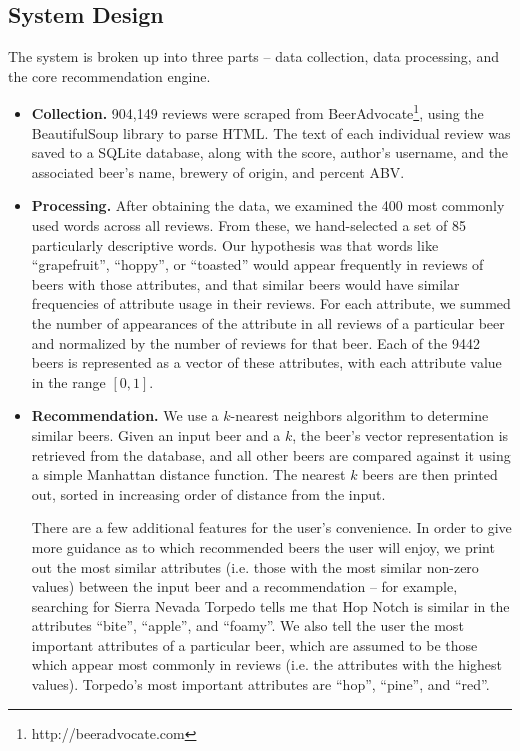 \documentclass[11pt]{article}
\begin{document}
\subsection*{System Design}
The system is broken up into three parts -- data collection, data processing, and the core recommendation engine.
\begin{itemize}
\item \textbf{Collection.} 904,149 reviews were scraped from BeerAdvocate\footnote{http://beeradvocate.com}, using the BeautifulSoup library to parse HTML. The text of each individual review was saved to a SQLite database, along with the score, author's username, and the associated beer's name, brewery of origin, and percent ABV.
\item \textbf{Processing.} After obtaining the data, we examined the 400 most commonly used words across all reviews. From these, we hand-selected a set of 85 particularly descriptive words. Our hypothesis was that words like ``grapefruit'', ``hoppy'', or ``toasted'' would appear frequently in reviews of beers with those attributes, and that similar beers would have similar frequencies of attribute usage in their reviews. For each attribute, we summed the number of appearances of the attribute in all reviews of a particular beer and normalized by the number of reviews for that beer. Each of the 9442 beers is represented as a vector of these attributes, with each attribute value in the range $[0, 1]$.
\item \textbf{Recommendation.} We use a $k$-nearest neighbors algorithm to determine similar beers. Given an input beer and a $k$, the beer's vector representation is retrieved from the database, and all other beers are compared against it using a simple Manhattan distance function. The nearest $k$ beers are then printed out, sorted in increasing order of distance from the input.
  
  There are a few additional features for the user's convenience. In order to give more guidance as to which recommended beers the user will enjoy, we print out the most similar attributes (i.e. those with the most similar non-zero values) between the input beer and a recommendation -- for example, searching for Sierra Nevada Torpedo tells me that Hop Notch is similar in the attributes ``bite'', ``apple'', and ``foamy''. We also tell the user the most important attributes of a particular beer, which are assumed to be those which appear most commonly in reviews (i.e. the attributes with the highest values). Torpedo's most important attributes are ``hop'', ``pine'', and ``red''.
  

\end{itemize}
\end{document}
